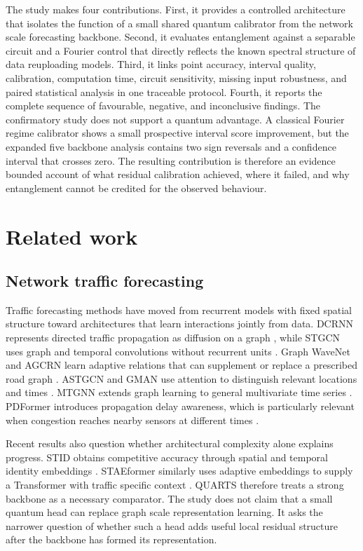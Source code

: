 \documentclass[pdflatex,sn-mathphys-num]{sn-jnl}
\begin{document}
The study makes four contributions. First, it provides a controlled architecture that isolates the function of a small shared quantum calibrator from the network scale forecasting backbone. Second, it evaluates entanglement against a separable circuit and a Fourier control that directly reflects the known spectral structure of data reuploading models. Third, it links point accuracy, interval quality, calibration, computation time, circuit sensitivity, missing input robustness, and paired statistical analysis in one traceable protocol. Fourth, it reports the complete sequence of favourable, negative, and inconclusive findings. The confirmatory study does not support a quantum advantage. A classical Fourier regime calibrator shows a small prospective interval score improvement, but the expanded five backbone analysis contains two sign reversals and a confidence interval that crosses zero. The resulting contribution is therefore an evidence bounded account of what residual calibration achieved, where it failed, and why entanglement cannot be credited for the observed behaviour.

\section{Related work}\label{sec:related}

\subsection{Network traffic forecasting}\label{subsec:classical}

Traffic forecasting methods have moved from recurrent models with fixed spatial structure toward architectures that learn interactions jointly from data. DCRNN represents directed traffic propagation as diffusion on a graph \cite{li2018dcrnn}, while STGCN uses graph and temporal convolutions without recurrent units \cite{yu2018stgcn}. Graph WaveNet and AGCRN learn adaptive relations that can supplement or replace a prescribed road graph \cite{wu2019graphwavenet,bai2020agcrn}. ASTGCN and GMAN use attention to distinguish relevant locations and times \cite{guo2019astgcn,zheng2020gman}. MTGNN extends graph learning to general multivariate time series \cite{wu2020mtgnn}. PDFormer introduces propagation delay awareness, which is particularly relevant when congestion reaches nearby sensors at different times \cite{jiang2023pdformer}.

Recent results also question whether architectural complexity alone explains progress. STID obtains competitive accuracy through spatial and temporal identity embeddings \cite{shao2022stid}. STAEformer similarly uses adaptive embeddings to supply a Transformer with traffic specific context \cite{liu2023staeformer}. QUARTS therefore treats a strong backbone as a necessary comparator. The study does not claim that a small quantum head can replace graph scale representation learning. It asks the narrower question of whether such a head adds useful local residual structure after the backbone has formed its representation.
\end{document}
